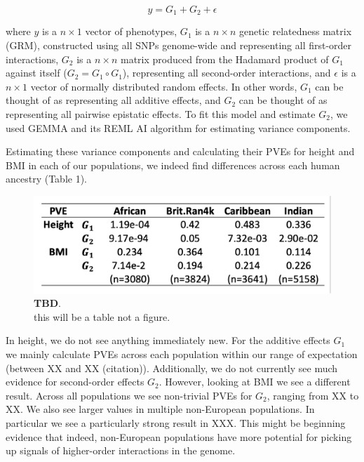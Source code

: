 \documentclass[12pt, a4paper]{article}
\begin{document}
\begin{equation}\label{InterPath-GEMMA-Equation-Model}
 y = G_1 + G_2 + \epsilon
\end{equation}

where $y$ is a $n \times 1$ vector of phenotypes, $G_1$ is a $n \times n$ genetic relatedness matrix (GRM), constructed using all SNPs genome-wide and representing all first-order interactions, $G_2$ is a $n \times n$ matrix produced from the Hadamard product of $G_1$ against itself ($G_2 = G_1 \circ G_1$), representing all second-order interactions, and $\epsilon$ is a $n \times 1$ vector of normally distributed random effects. In other words, $G_1$ can be thought of as representing all additive effects, and $G_2$ can be thought of as representing all pairwise epistatic effects. To fit this model and estimate $G_2$, we used GEMMA \citep{Zhou2012} and its REML AI algorithm for estimating variance components.

Estimating these variance components and calculating their PVEs for height and BMI in each of our populations, we indeed find differences across each human ancestry (Table 1).

\begin{figure}[ht]
\centering
\includegraphics[scale=1]{Images/Table1_Placeholder.png}
\caption[TBD]{\textbf{TBD}. \\ this will be a table not a figure.}
\label{IntrePath-Main-Table-GEMMA}
\end{figure}

In height, we do not see anything immediately new. For the additive effects $G_1$ we mainly calculate PVEs across each population within our range of expectation (between XX and XX (citation)). Additionally, we do not currently see much evidence for second-order effects $G_2$. However, looking at BMI we see a different result. Across all populations we see non-trivial PVEs for $G_2$, ranging from XX to XX. We also see larger values in multiple non-European populations. In particular we see a particularly strong result in XXX. This might be beginning evidence that indeed, non-European populations have more potential for picking up signals of higher-order interactions in the genome.   
\end{document}
